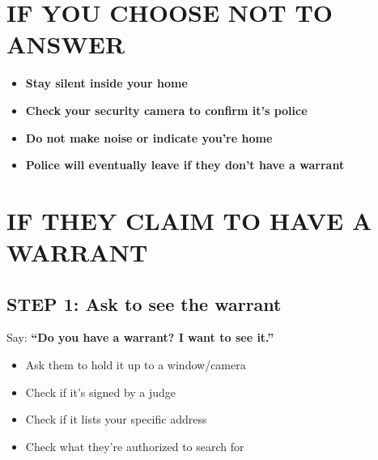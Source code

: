 \documentclass[10pt,letterpaper,twocolumn]{article}
\begin{document}

\section{IF YOU CHOOSE NOT TO ANSWER}

\begin{itemize}[leftmargin=*]
    \item[{\checkmark}] \textbf{Stay silent inside your home}
    \item[{\checkmark}] \textbf{Check your security camera to confirm it's police}
    \item[{\checkmark}] \textbf{Do not make noise or indicate you're home}
    \item[{\checkmark}] \textbf{Police will eventually leave if they don't have a warrant}
\end{itemize}

\section{IF THEY CLAIM TO HAVE A WARRANT}

\subsection{STEP 1: Ask to see the warrant}

Say: \textbf{``Do you have a warrant? I want to see it.''}

\begin{itemize}[leftmargin=*]
    \item Ask them to hold it up to a window/camera
    \item Check if it's signed by a judge
    \item Check if it lists your specific address
    \item Check what they're authorized to search for
\end{itemize}
\end{document}
